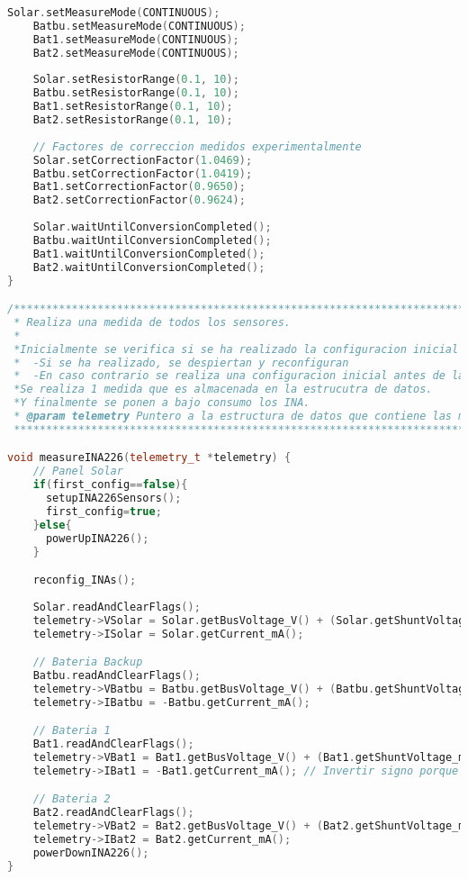 \begin{lstlisting}[language=c++,caption={Fichero\texttt{ina.cpp}}, captionpos=b]
    Solar.setMeasureMode(CONTINUOUS);
    Batbu.setMeasureMode(CONTINUOUS);
    Bat1.setMeasureMode(CONTINUOUS);
    Bat2.setMeasureMode(CONTINUOUS);
    
    Solar.setResistorRange(0.1, 10);
    Batbu.setResistorRange(0.1, 10);
    Bat1.setResistorRange(0.1, 10);
    Bat2.setResistorRange(0.1, 10);
    
    // Factores de correccion medidos experimentalmente
    Solar.setCorrectionFactor(1.0469);
    Batbu.setCorrectionFactor(1.0419);
    Bat1.setCorrectionFactor(0.9650);
    Bat2.setCorrectionFactor(0.9624);
    
    Solar.waitUntilConversionCompleted();
    Batbu.waitUntilConversionCompleted();
    Bat1.waitUntilConversionCompleted();
    Bat2.waitUntilConversionCompleted();
}

/**************************************************************************//**
 * Realiza una medida de todos los sensores.
 *
 *Inicialmente se verifica si se ha realizado la configuracion inicial de los INAs.
 *  -Si se ha realizado, se despiertan y reconfiguran
 *  -En caso contrario se realiza una configuracion inicial antes de la captacion de datos.
 *Se realiza 1 medida que es almacenada en la estrucutra de datos.
 *Y finalmente se ponen a bajo consumo los INA.
 * @param telemetry Puntero a la estructura de datos que contiene las medidas de tension y corriente de las baterias y panel solar.
 ******************************************************************************/

void measureINA226(telemetry_t *telemetry) {
    // Panel Solar
    if(first_config==false){
      setupINA226Sensors();
      first_config=true;
    }else{
      powerUpINA226();  
    }

    reconfig_INAs();
    
    Solar.readAndClearFlags();
    telemetry->VSolar = Solar.getBusVoltage_V() + (Solar.getShuntVoltage_mV() / 100);
    telemetry->ISolar = Solar.getCurrent_mA();

    // Bateria Backup
    Batbu.readAndClearFlags();
    telemetry->VBatbu = Batbu.getBusVoltage_V() + (Batbu.getShuntVoltage_mV() / 100);
    telemetry->IBatbu = -Batbu.getCurrent_mA();

    // Bateria 1
    Bat1.readAndClearFlags();
    telemetry->VBat1 = Bat1.getBusVoltage_V() + (Bat1.getShuntVoltage_mV() / 100);
    telemetry->IBat1 = -Bat1.getCurrent_mA(); // Invertir signo porque esta al reves

    // Bateria 2
    Bat2.readAndClearFlags();
    telemetry->VBat2 = Bat2.getBusVoltage_V() + (Bat2.getShuntVoltage_mV() / 100);
    telemetry->IBat2 = Bat2.getCurrent_mA();
    powerDownINA226();
}


\end{lstlisting}

